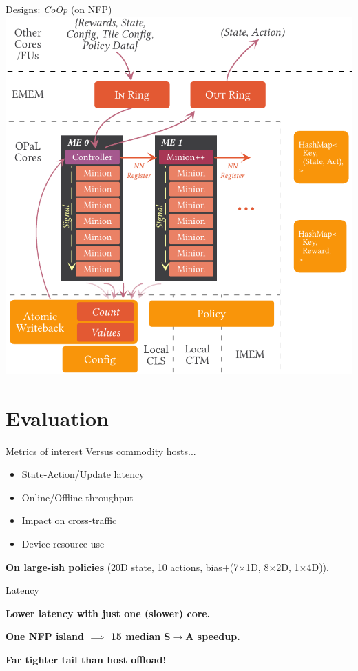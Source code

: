 \documentclass[aspectratio=169,xcolor={dvipsnames}
,handout
]{beamer}
\begin{document}
\begin{frame}{Designs: \emph{CoOp} (on NFP)}
	\centering
	\includegraphics[width=0.535\linewidth]{../paper/figures/coop}
\end{frame}

\section{Evaluation}

\begin{frame}{Metrics of interest}
	Versus commodity hosts...
	\begin{itemize}[<+->]
		\item State-Action/Update latency
		\item Online/Offline throughput
		\item Impact on cross-traffic
		\item Device resource use
	\end{itemize}\pause
	\textbf{On large-ish policies} (20D state, 10 actions, bias+(7$\times$1D, 8$\times$2D, 1$\times$4D)).
\end{frame}

\begin{frame}{Latency}
	\centering
	\pause
	
	\textbf{Lower latency with \alert{just one (slower) core}.}\pause
	
	\textbf{One NFP island $\implies$ \alert{\qty{15}{\times} median S$\rightarrow$A speedup}.}\pause
	
	\textbf{Far tighter tail than host offload!}
\end{frame}
\end{document}
